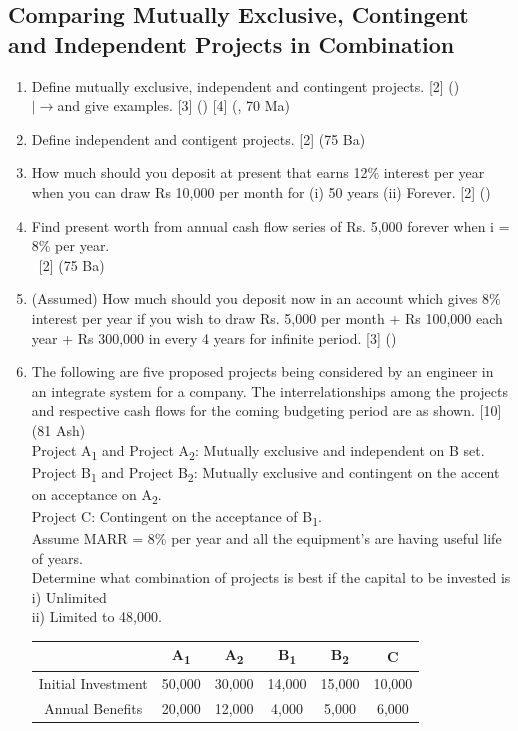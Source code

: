 \documentclass[12pt]{article}
\newcommand{\lb}{\\ $\left|\rightarrow\right.$}
\newcommand{\enter}{\\\textcolor{white}{1}}
\newcommand{\sub}[1]{\textsubscript{#1}}
\begin{document}
	\subsection{Comparing Mutually Exclusive, Contingent and Independent Projects in Combination}
		\begin{enumerate}[noitemsep, topsep = 0pt]
			\item Define mutually exclusive, independent and contingent projects. \hfill [2] ()
			\lb and give examples. \hfill [3] () [4] (, 70 Ma)
			
			\item Define independent and contigent projects. \hfill [2] (75 Ba)
			
			\item How much should you deposit at present that earns 12\% interest per year when you can draw Rs 10,000 per month for (i) 50 years (ii) Forever. \hfill [2] ()
			
			\item Find present worth from annual cash flow series of Rs. 5,000 forever when i = 8\% per year.
			\enter\hfill [2] (75 Ba)
			
			\item (Assumed) How much should you deposit now in an account which gives 8\% interest per year if you wish to draw Rs. 5,000 per month + Rs 100,000 each year + Rs 300,000 in every 4 years for infinite period. \hfill [3] ()
			
			\item The following are five proposed projects being considered by an engineer in an integrate system for a company. The interrelationships among the projects and respective cash flows for the coming budgeting period are as shown. \hfill [10] (81 Ash)\\
			Project A\sub{1} and Project A\sub{2}: Mutually exclusive and independent on B set.\\
			Project B\sub{1} and Project B\sub{2}: Mutually exclusive and contingent on the accent on acceptance on A\sub{2}.\\
			Project C: Contingent on the acceptance of B\sub{1}.\\
			Assume MARR = 8\% per year and all the equipment's are having useful life of years.\\
			Determine what combination of projects is best if the capital to be invested is\\
			i) Unlimited\\
			ii) Limited to 48,000.\\
			\begin{tabular}{|c|c|c|c|c|c|}
				\hline
				& A\sub{1} & A\sub{2} & B\sub{1} & B\sub{2} & C \\ \hline
				Initial Investment & 50,000 & 30,000 & 14,000 & 15,000 & 10,000 \\ \hline
				Annual Benefits & 20,000 & 12,000 & 4,000 & 5,000 & 6,000 \\ \hline
			\end{tabular}\\[0pt]
			

\end{enumerate}
\end{document}
